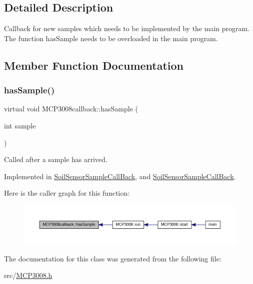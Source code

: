 \subsection{Detailed Description}
Callback for new samples which needs to be implemented by the main program. The function has\+Sample needs to be overloaded in the main program. 

\subsection{Member Function Documentation}
\mbox{\label{classMCP3008callback_ad8c681193caaa955bf123666fc91e06a}} 
\subsubsection{\texorpdfstring{has\+Sample()}{hasSample()}}
{\footnotesize\ttfamily virtual void M\+C\+P3008callback\+::has\+Sample (\begin{DoxyParamCaption}\item[{int}]{sample }\end{DoxyParamCaption})\hspace{0.3cm}{\ttfamily [pure virtual]}}

Called after a sample has arrived. 

Implemented in \hyperlink{classSoilSensorSampleCallBack_a6bacdcc40b01f6a427f0f9ef2210fa76}{Soil\+Sensor\+Sample\+Call\+Back}, and \hyperlink{classSoilSensorSampleCallBack_a6bacdcc40b01f6a427f0f9ef2210fa76}{Soil\+Sensor\+Sample\+Call\+Back}.

Here is the caller graph for this function\+:
\nopagebreak
\begin{figure}[H]
\begin{center}
\leavevmode
\includegraphics[width=350pt]{classMCP3008callback_ad8c681193caaa955bf123666fc91e06a_icgraph}
\end{center}
\end{figure}


The documentation for this class was generated from the following file\+:\begin{DoxyCompactItemize}
\item 
src/\hyperlink{MCP3008_8h}{M\+C\+P3008.\+h}\end{DoxyCompactItemize}
